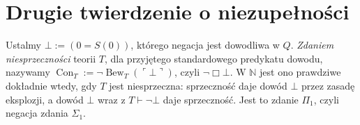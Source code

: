 \section{Drugie twierdzenie o niezupełności}\label{sec:drugie-twierdzenie}
\begin{definicja}\label{res:12:1}
Ustalmy $\bot:=(0=S(0))$, którego negacja jest dowodliwa w $Q$. \emph{Zdaniem niesprzeczności} teorii $T$, dla przyjętego standardowego predykatu dowodu, nazywamy $\operatorname{Con}_T:=\neg\operatorname{Bew}_T(\ulcorner\bot\urcorner)$, czyli $\neg\Box\bot$. W $\mathbb N$ jest ono prawdziwe dokładnie wtedy, gdy $T$ jest niesprzeczna: sprzeczność daje dowód $\bot$ przez zasadę eksplozji, a dowód $\bot$ wraz z $T\vdash\neg\bot$ daje sprzeczność. Jest to zdanie $\Pi_1$, czyli negacja zdania $\Sigma_1$.
\end{definicja}

